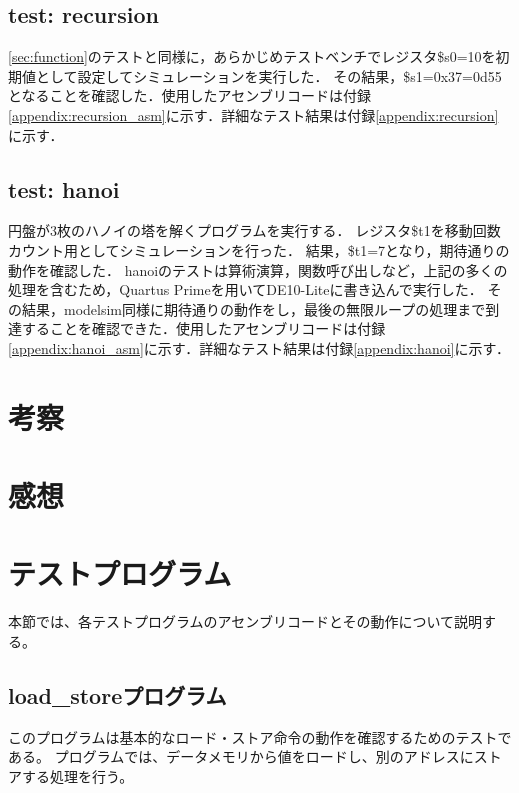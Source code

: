 \documentclass[dvipdfmx]{jsarticle}
\begin{document}
\subsection{test: recursion}
\ref{sec:function}のテストと同様に，あらかじめテストベンチでレジスタ\$s0=10を初期値として設定してシミュレーションを実行した．
その結果，\$s1=0x37=0d55となることを確認した．使用したアセンブリコードは付録\ref{appendix:recursion_asm}に示す．詳細なテスト結果は付録\ref{appendix:recursion}に示す．

\subsection{test: hanoi}
円盤が3枚のハノイの塔を解くプログラムを実行する．
レジスタ\$t1を移動回数カウント用としてシミュレーションを行った．
結果，\$t1=7となり，期待通りの動作を確認した．
hanoiのテストは算術演算，関数呼び出しなど，上記の多くの処理を含むため，Quartus Primeを用いてDE10-Liteに書き込んで実行した．
その結果，modelsim同様に期待通りの動作をし，最後の無限ループの処理まで到達することを確認できた．使用したアセンブリコードは付録\ref{appendix:hanoi_asm}に示す．詳細なテスト結果は付録\ref{appendix:hanoi}に示す．



\section{考察}



\section{感想}



\appendix
\section{テストプログラム}

本節では、各テストプログラムのアセンブリコードとその動作について説明する。

\subsection{load\_storeプログラム}
\label{appendix:load_store_asm}
このプログラムは基本的なロード・ストア命令の動作を確認するためのテストである。
プログラムでは、データメモリから値をロードし、別のアドレスにストアする処理を行う。

\end{document}
